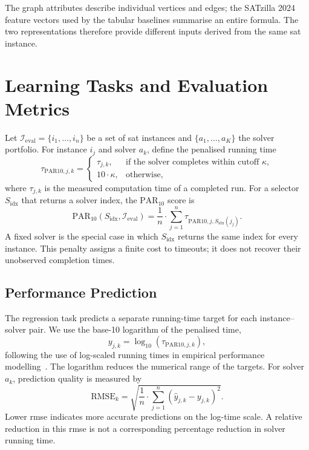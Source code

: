 The graph attributes describe individual vertices and edges; the SATzilla 2024 feature vectors used by the tabular baselines summarise an entire formula. The two representations therefore provide different inputs derived from the same \gls{sat} instance.


\FloatBarrier

\section{Learning Tasks and Evaluation Metrics}
\label{sec:ch07:tasks}
Let $\mathcal I_{\mathrm{eval}}=\{i_1,\ldots,i_n\}$ be a set of \gls{sat} instances and $\{a_1,\ldots,a_K\}$ the solver portfolio. For instance $i_j$ and solver $a_k$, define the penalised running time
\begin{equation}
\label{eq:ch07:penalised-time}
    \tau_{\mathrm{PAR10},j,k}=\begin{cases}
        \tau_{j,k}, & \text{if the solver completes within cutoff }\kappa,\\
        10\cdot \kappa, & \text{otherwise},
    \end{cases}
\end{equation}
where $\tau_{j,k}$ is the measured computation time of a completed run. For a selector $S_{\mathrm{idx}}$ that returns a solver index, the $\mathrm{PAR}_{10}$ score is
\begin{equation}
\label{eq:ch07:par10}
    \mathrm{PAR}_{10}(S_{\mathrm{idx}},\mathcal I_{\mathrm{eval}})=\frac{1}{n}\cdot\sum_{j=1}^n \tau_{\mathrm{PAR10},j,S_{\mathrm{idx}}(j_j)}.
\end{equation}
A fixed solver is the special case in which $S_{\mathrm{idx}}$ returns the same index for every instance. This penalty assigns a finite cost to timeouts; it does not recover their unobserved completion times.

\subsection{Performance Prediction}
The regression task predicts a separate running-time target for each instance--solver pair. We use the base-10 logarithm of the penalised time,
\begin{equation}
\label{eq:ch07:runtime-target}
    y_{j,k}=\log_{10}(\tau_{\mathrm{PAR10},j,k}),
\end{equation}
following the use of log-scaled running times in empirical performance modelling~\citep{HutEtAl14e}. The logarithm reduces the numerical range of the targets. For solver $a_k$, prediction quality is measured by
\begin{equation}
\label{eq:ch07:rmse}
    \mathrm{RMSE}_k=\sqrt{\frac{1}{n}\cdot\sum_{j=1}^n
        (\widehat y_{j,k}-y_{j,k})^2}.
\end{equation}
Lower \gls{rmse} indicates more accurate predictions on the log-time scale. A relative reduction in this \gls{rmse} is not a corresponding percentage reduction in solver running time.

